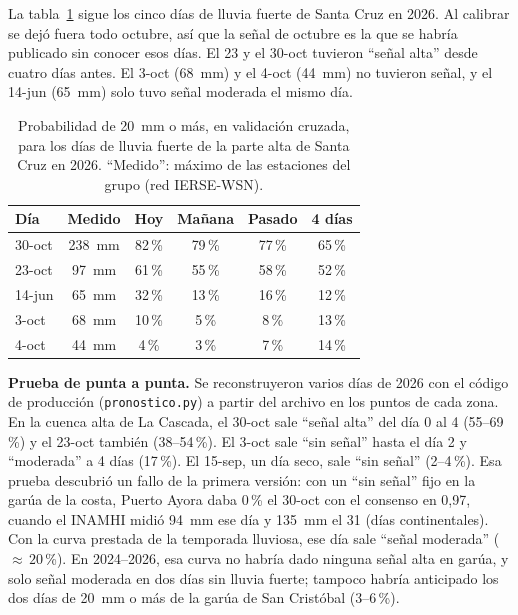 \documentclass{sosg-informe}
\begin{document}
La tabla~\ref{tab:eventos} sigue los cinco días de lluvia fuerte de Santa Cruz en 2026. Al calibrar se dejó fuera todo octubre, así que la señal de octubre es la que se habría publicado sin conocer esos días. El 23 y el 30-oct tuvieron \enquote{señal alta} desde cuatro días antes. El 3-oct (68~mm) y el 4-oct (44~mm) no tuvieron señal, y el 14-jun (65~mm) solo tuvo señal moderada el mismo día.

\begin{table}[ht]
  \centering\small
  \caption{Probabilidad de 20~mm o más, en validación cruzada, para los días de lluvia fuerte de la parte alta de Santa Cruz en 2026. \enquote{Medido}: máximo de las estaciones del grupo (red IERSE-WSN).}
  \label{tab:eventos}
  \begin{tabular}{lccccc}
    \toprule
    Día & Medido & Hoy & Mañana & Pasado & 4 días \\
    \midrule
    30-oct & 238~mm & 82\,\% & 79\,\% & 77\,\% & 65\,\% \\
    23-oct & 97~mm & 61\,\% & 55\,\% & 58\,\% & 52\,\% \\
    14-jun & 65~mm & 32\,\% & 13\,\% & 16\,\% & 12\,\% \\
    3-oct & 68~mm & 10\,\% & 5\,\% & 8\,\% & 13\,\% \\
    4-oct & 44~mm & 4\,\% & 3\,\% & 7\,\% & 14\,\% \\
    \bottomrule
  \end{tabular}
\end{table}

\textbf{Prueba de punta a punta.} Se reconstruyeron varios días de 2026 con el código de producción (\texttt{pronostico.py}) a partir del archivo en los puntos de cada zona. En la cuenca alta de La Cascada, el 30-oct sale \enquote{señal alta} del día 0 al 4 (55--69\,\%) y el 23-oct también (38--54\,\%). El 3-oct sale \enquote{sin señal} hasta el día 2 y \enquote{moderada} a 4 días (17\,\%). El 15-sep, un día seco, sale \enquote{sin señal} (2--4\,\%). Esa prueba descubrió un fallo de la primera versión: con un \enquote{sin señal} fijo en la garúa de la costa, Puerto Ayora daba 0\,\% el 30-oct con el consenso en 0,97, cuando el INAMHI midió 94~mm ese día y 135~mm el 31 (días continentales). Con la curva prestada de la temporada lluviosa, ese día sale \enquote{señal moderada} (${\approx}\,20$\,\%). En 2024--2026, esa curva no habría dado ninguna señal alta en garúa, y solo señal moderada en dos días sin lluvia fuerte; tampoco habría anticipado los dos días de 20~mm o más de la garúa de San Cristóbal (3--6\,\%).
\end{document}
